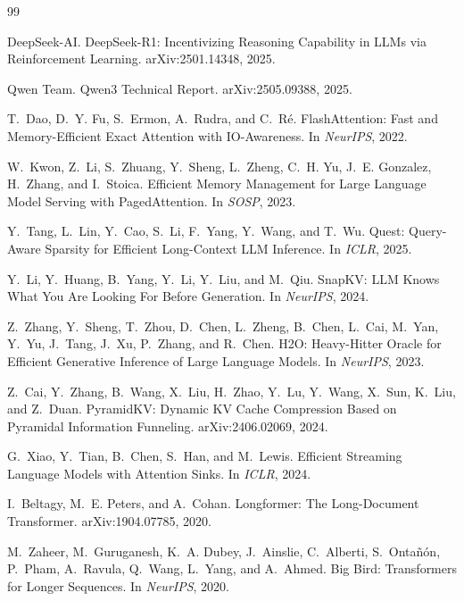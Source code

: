 \documentclass[11pt]{article}
\begin{document}
\begin{thebibliography}{99}\small

DeepSeek-AI. DeepSeek-R1: Incentivizing Reasoning Capability in LLMs via Reinforcement Learning. arXiv:2501.14348, 2025.

Qwen Team. Qwen3 Technical Report. arXiv:2505.09388, 2025.

T.~Dao, D.~Y. Fu, S.~Ermon, A.~Rudra, and C.~R\'{e}. FlashAttention: Fast and Memory-Efficient Exact Attention with IO-Awareness. In \emph{NeurIPS}, 2022.

W.~Kwon, Z.~Li, S.~Zhuang, Y.~Sheng, L.~Zheng, C.~H. Yu, J.~E. Gonzalez, H.~Zhang, and I.~Stoica. Efficient Memory Management for Large Language Model Serving with PagedAttention. In \emph{SOSP}, 2023.

Y.~Tang, L.~Lin, Y.~Cao, S.~Li, F.~Yang, Y.~Wang, and T.~Wu. Quest: Query-Aware Sparsity for Efficient Long-Context LLM Inference. In \emph{ICLR}, 2025.

Y.~Li, Y.~Huang, B.~Yang, Y.~Li, Y.~Liu, and M.~Qiu. SnapKV: LLM Knows What You Are Looking For Before Generation. In \emph{NeurIPS}, 2024.

Z.~Zhang, Y.~Sheng, T.~Zhou, D.~Chen, L.~Zheng, B.~Chen, L.~Cai, M.~Yan, Y.~Yu, J.~Tang, J.~Xu, P.~Zhang, and R.~Chen. H2O: Heavy-Hitter Oracle for Efficient Generative Inference of Large Language Models. In \emph{NeurIPS}, 2023.

Z.~Cai, Y.~Zhang, B.~Wang, X.~Liu, H.~Zhao, Y.~Lu, Y.~Wang, X.~Sun, K.~Liu, and Z.~Duan. PyramidKV: Dynamic KV Cache Compression Based on Pyramidal Information Funneling. arXiv:2406.02069, 2024.

G.~Xiao, Y.~Tian, B.~Chen, S.~Han, and M.~Lewis. Efficient Streaming Language Models with Attention Sinks. In \emph{ICLR}, 2024.

I.~Beltagy, M.~E. Peters, and A.~Cohan. Longformer: The Long-Document Transformer. arXiv:1904.07785, 2020.

M.~Zaheer, M.~Guruganesh, K.~A. Dubey, J.~Ainslie, C.~Alberti, S.~Onta\~{n}\'{o}n, P.~Pham, A.~Ravula, Q.~Wang, L.~Yang, and A.~Ahmed. Big Bird: Transformers for Longer Sequences. In \emph{NeurIPS}, 2020.


\end{thebibliography}
\end{document}

